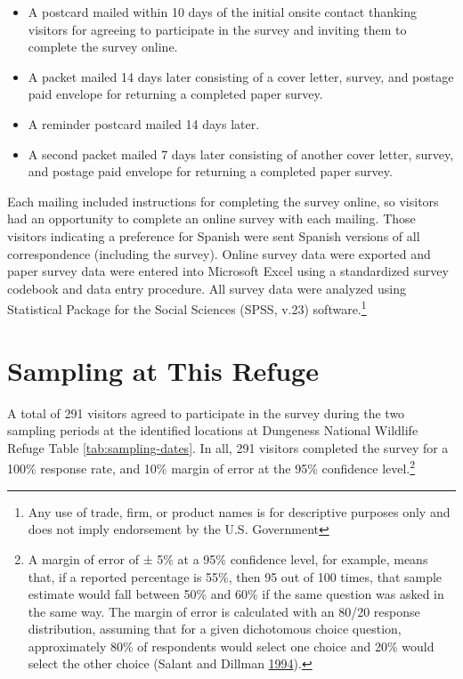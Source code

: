 \documentclass[]{book}
\providecommand{\tightlist}{%
  \setlength{\itemsep}{0pt}\setlength{\parskip}{0pt}}
\let\rmarkdownfootnote\footnote%
\def\footnote{\protect\rmarkdownfootnote}
\begin{document}
\begin{itemize}
\tightlist
\item
  A postcard mailed within 10 days of the initial onsite contact
  thanking visitors for agreeing to participate in the survey and
  inviting them to complete the survey online.
\item
  A packet mailed 14 days later consisting of a cover letter, survey,
  and postage paid envelope for returning a completed paper survey.
\item
  A reminder postcard mailed 14 days later.
\item
  A second packet mailed 7 days later consisting of another cover
  letter, survey, and postage paid envelope for returning a completed
  paper survey.
\end{itemize}

Each mailing included instructions for completing the survey online, so
visitors had an opportunity to complete an online survey with each
mailing. Those visitors indicating a preference for Spanish were sent
Spanish versions of all correspondence (including the survey). Online
survey data were exported and paper survey data were entered into
Microsoft Excel using a standardized survey codebook and data entry
procedure. All survey data were analyzed using Statistical Package for
the Social Sciences (SPSS, v.23) software.\footnote{Any use of trade,
  firm, or product names is for descriptive purposes only and does not
  imply endorsement by the U.S. Government}

\section{Sampling at This Refuge}\label{sampling-at-this-refuge}

A total of 291 visitors agreed to participate in the survey during the
two sampling periods at the identified locations at Dungeness National
Wildlife Refuge Table \ref{tab:sampling-dates}. In all, 291 visitors
completed the survey for a 100\% response rate, and 10\% margin of error
at the 95\% confidence level.\footnote{A margin of error of ± 5\% at a
  95\% confidence level, for example, means that, if a reported
  percentage is 55\%, then 95 out of 100 times, that sample estimate
  would fall between 50\% and 60\% if the same question was asked in the
  same way. The margin of error is calculated with an 80/20 response
  distribution, assuming that for a given dichotomous choice question,
  approximately 80\% of respondents would select one choice and 20\%
  would select the other choice (Salant and Dillman
  \protect\hyperlink{ref-salant1994}{1994}).}
\end{document}
